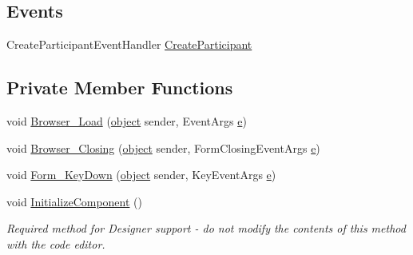\subsection*{Events}
\begin{DoxyCompactItemize}
\item 
Create\+Participant\+Event\+Handler \hyperlink{class_web_analyzer_1_1_u_i_1_1_edit_participant_form_a3c5b726a8fd6993ccc519319a6850ce3}{Create\+Participant}
\end{DoxyCompactItemize}
\subsection*{Private Member Functions}
\begin{DoxyCompactItemize}
\item 
void \hyperlink{class_web_analyzer_1_1_u_i_1_1_edit_participant_form_aef2814fadc79c7aa697b4ded9f5fbae6}{Browser\+\_\+\+Load} (\hyperlink{_u_i_2_h_t_m_l_resources_2js_2lib_2underscore_8min_8js_aae18b7515bb2bc4137586506e7c0c903}{object} sender, Event\+Args \hyperlink{_u_i_2_h_t_m_l_resources_2js_2lib_2bootstrap_8min_8js_ab5902775854a8b8440bcd25e0fe1c120}{e})
\item 
void \hyperlink{class_web_analyzer_1_1_u_i_1_1_edit_participant_form_afff898864bfcb4f8babcad40c31b1a28}{Browser\+\_\+\+Closing} (\hyperlink{_u_i_2_h_t_m_l_resources_2js_2lib_2underscore_8min_8js_aae18b7515bb2bc4137586506e7c0c903}{object} sender, Form\+Closing\+Event\+Args \hyperlink{_u_i_2_h_t_m_l_resources_2js_2lib_2bootstrap_8min_8js_ab5902775854a8b8440bcd25e0fe1c120}{e})
\item 
void \hyperlink{class_web_analyzer_1_1_u_i_1_1_edit_participant_form_a6027797a3ff9fabae8e55000c8ddddc6}{Form\+\_\+\+Key\+Down} (\hyperlink{_u_i_2_h_t_m_l_resources_2js_2lib_2underscore_8min_8js_aae18b7515bb2bc4137586506e7c0c903}{object} sender, Key\+Event\+Args \hyperlink{_u_i_2_h_t_m_l_resources_2js_2lib_2bootstrap_8min_8js_ab5902775854a8b8440bcd25e0fe1c120}{e})
\item 
void \hyperlink{class_web_analyzer_1_1_u_i_1_1_edit_participant_form_a234fe4b54a3a59a708b4d8ecf1363934}{Initialize\+Component} ()
\begin{DoxyCompactList}\small\item\em Required method for Designer support -\/ do not modify the contents of this method with the code editor. \end{DoxyCompactList}\end{DoxyCompactItemize}
